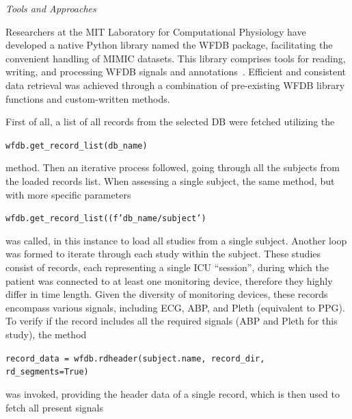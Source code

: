 \vspace{0.2cm}
\textit{Tools and Approaches}
\vspace{0.2cm}

Researchers at the MIT Laboratory for Computational Physiology have developed a native Python library named the WFDB package, facilitating the convenient handling of MIMIC datasets.
This library comprises tools for reading, writing, and processing WFDB signals and annotations~\cite{MITLCPWfdbpython2024}.
Efficient and consistent data retrieval was achieved through a combination of pre-existing WFDB library functions and custom-written methods.

First of all, a list of all records from the selected DB were fetched utilizing the

\vspace{0.1cm}
{\centering \texttt{wfdb.get\_record\_list(db\_name)}\par}
\vspace{0.1cm}

\noindent method.
Then an iterative process followed, going through all the subjects from the loaded records list.
When assessing a single subject, the same method, but with more specific parameters

\vspace{0.1cm}
{\centering \texttt{wfdb.get\_record\_list((f'{db\_name}/{subject}')}\par}
\vspace{0.1cm}

\noindent was called, in this instance to load all studies from a single subject.
Another loop was formed to iterate through each study within the subject.
These studies consist of records, each representing a single ICU \enquote{session}, during which the patient was connected to at least one monitoring device, therefore they highly differ in time length.
Given the diversity of monitoring devices, these records encompass various signals, including ECG, ABP, and Pleth (equivalent to PPG).
To verify if the record includes all the required signals (ABP and Pleth for this study), the method

\vspace{0.1cm}
{\centering \texttt{record\_data = wfdb.rdheader(subject.name, record\_dir, rd\_segments=True)}\par}
\vspace{0.1cm}

\noindent was invoked, providing the header data of a single record, which is then used to fetch all present signals

